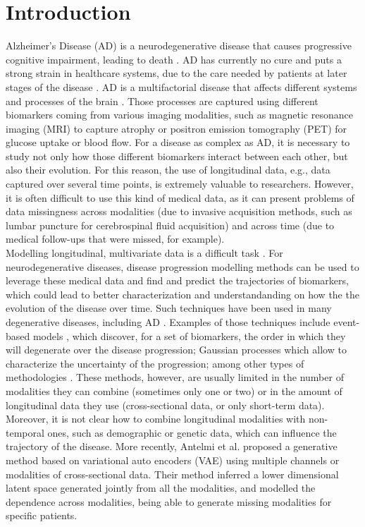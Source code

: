 \section{Introduction}

Alzheimer's Disease (AD) is a neurodegenerative disease that causes progressive cognitive impairment, leading to death \cite{Lane2018}. AD has currently no cure and puts a strong strain in healthcare systems, due to the care needed by patients at later stages of the disease \cite{AlzheimersAssociation}. AD is a multifactorial disease that affects different systems and processes of the brain \cite{Jack2010}. Those processes are captured using different biomarkers coming from various imaging modalities, such as magnetic resonance imaging (MRI) to capture atrophy or positron emission tomography (PET) for glucose uptake or blood flow. For a disease as complex as AD, it is necessary to study not only how those different biomarkers interact between each other, but also their evolution. For this reason, the use of longitudinal data, e.g., data captured over several time points, is extremely valuable to researchers. However, it is often difficult to use this kind of medical data, as it can present problems of data missingness across modalities (due to invasive acquisition methods, such as lumbar puncture for cerebrospinal fluid acquisition) and across time (due to medical follow-ups that were missed, for example). \\

Modelling longitudinal, multivariate data is a difficult task \cite{Verbeke2014}. For neurodegenerative diseases, disease progression modelling methods can be used to leverage these medical data and find and predict the trajectories of biomarkers, which could lead to better characterization and understandanding on how the the evolution of the disease over time. Such techniques have been used in many degenerative diseases, including AD \cite{Oxtoby2017,Marti-Juan2020}. Examples of those techniques include event-based models \cite{Young2014,Young2015a,Fonteijn2012}, which discover, for a set of biomarkers, the order in which they will degenerate over the disease progression; Gaussian processes \cite{Lorenzi2015b,Hyun2016,Lorenzi2019} which allow to characterize the uncertainty of the progression; among other types of methodologies \cite{Marinescu2019, Young2017}. These methods, however, are usually limited in the number of modalities they can combine (sometimes only one or two) or in the amount of longitudinal data they use (cross-sectional data, or only short-term data). Moreover, it is not clear how to combine longitudinal modalities with non-temporal ones, such as demographic or genetic data, which can influence the trajectory of the disease. More recently, Antelmi et al. \cite{Antelmi2019} proposed a generative method based on variational auto encoders (VAE) using multiple channels or modalities of cross-sectional data. Their method inferred a lower dimensional latent space generated jointly from all the modalities, and modelled the dependence across modalities, being able to generate missing modalities for specific patients. \\

